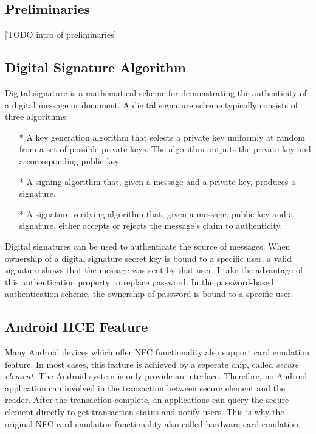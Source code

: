 \begin{CJK}{Bg5}{bsmi}


\chapter{Preliminaries}

[TODO intro of preliminaries]

\section{Digital Signature Algorithm}

Digital signature is a mathematical scheme for demonstrating the authenticity of a digital message or document. A digital signature scheme typically consists of three algorithms:

\begin{enumerate}
\item[*] A key generation algorithm that selects a private key uniformly at random from a set of possible private keys. The algorithm outputs the private key and a corresponding public key.
\item[*] A signing algorithm that, given a message and a private key, produces a signature.
\item[*] A signature verifying algorithm that, given a message, public key and a signature, either accepts or rejects the message's claim to authenticity.
\end{enumerate}

Digital signatures can be used to authenticate the source of messages. When ownership of a digital signature secret key is bound to a specific user, a valid signature shows that the message was sent by that user. I take the advantage of this authentication property to replace password. In the password-based authentication scheme, the ownership of password is bound to a specific user. 

\section{Android HCE Feature}

Many Android devices which offer NFC functionality also support card emulation feature. In most cases, this feature is achieved by a seperate chip, called \emph{secure element}. The Android system is only provide an interface. Therefore, no Android application can involved in the transaction between secure element and the reader. After the transaction complete, an applications can query the secure element directly to get transaction status and notify users. This is why the original NFC card emulaiton functionality also called hardware card emulation.


\end{CJK}

